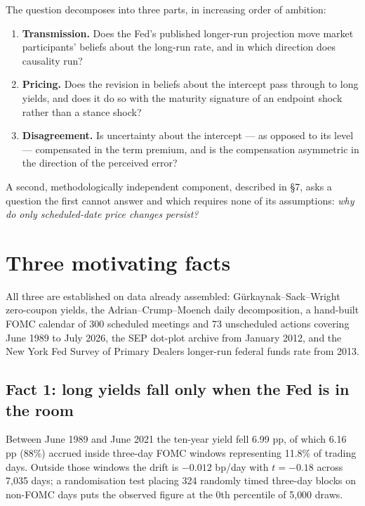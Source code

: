\documentclass[11pt]{article}
\begin{document}
\noindent The question decomposes into three parts, in increasing order of ambition:

\begin{enumerate}\setlength\itemsep{0.15em}
\item \textbf{Transmission.} Does the Fed's published longer-run projection move market
participants' beliefs about the long-run rate, and in which direction does causality run?
\item \textbf{Pricing.} Does the revision in beliefs about the intercept pass through to long
yields, and does it do so with the maturity signature of an endpoint shock rather than a
stance shock?
\item \textbf{Disagreement.} Is uncertainty about the intercept --- as opposed to its level ---
compensated in the term premium, and is the compensation asymmetric in the direction of the
perceived error?
\end{enumerate}

A second, methodologically independent component, described in \S7, asks a question the
first cannot answer and which requires none of its assumptions: \emph{why do only
scheduled-date price changes persist?}

\section{Three motivating facts}

All three are established on data already assembled: Gürkaynak--Sack--Wright zero-coupon
yields, the Adrian--Crump--Moench daily decomposition, a hand-built FOMC calendar of 300
scheduled meetings and 73 unscheduled actions covering June 1989 to July 2026, the SEP
dot-plot archive from January 2012, and the New York Fed Survey of Primary Dealers
longer-run federal funds rate from 2013.

\subsection{Fact 1: long yields fall only when the Fed is in the room}

Between June 1989 and June 2021 the ten-year yield fell 6.99 pp, of which 6.16 pp (88\%)
accrued inside three-day FOMC windows representing 11.8\% of trading days. Outside those
windows the drift is $-0.012$ bp/day with $t = -0.18$ across 7{,}035 days; a randomisation
test placing 324 randomly timed three-day blocks on non-FOMC days puts the observed figure at
the 0th percentile of 5{,}000 draws.
\end{document}

